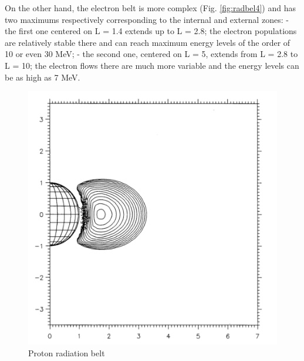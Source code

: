 \documentclass[./dissertation.tex]{subfiles}
\begin{document}
On the other hand, the electron belt is more complex (Fig. \ref{fig:radbel4}) and has two
maximums respectively corresponding to the internal and
external zones:
- the first one centered on L = 1.4 extends up to L = 2.8; the
electron populations are relatively stable there and can reach
maximum energy levels of the order of 10 or even 30 MeV;
- the second one, centered on L = 5, extends from L = 2.8 to
L = 10; the electron flows there are much more variable and
the energy levels can be as high as 7 MeV.

\begin{figure}[h!]
\centering
  \includegraphics[scale = 0.50]{imgs/radbelt3.png}
  \caption{Proton radiation belt \cite{bib2}}
  \label{fig:radbel3}
\end{figure}
\end{document}
